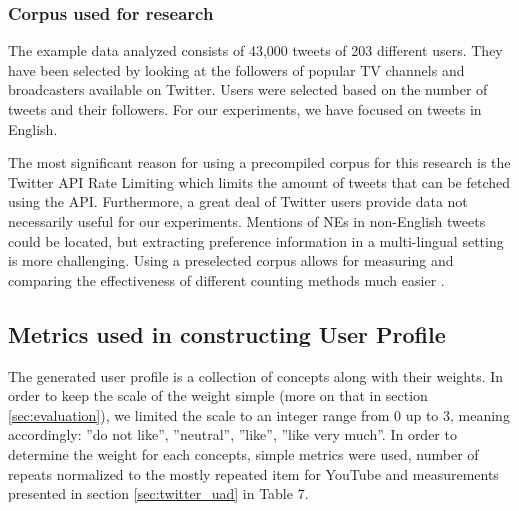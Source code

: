 \subsubsection{Corpus used for research}
\label{sec:twitter_corpus}

The example data analyzed consists of 43,000 tweets of 203 different users.
They have been selected by looking at the followers of popular TV channels and broadcasters
available on Twitter. Users were selected based on the number of tweets and their followers.
For our experiments, we have focused on tweets in English.

The most significant reason for using a precompiled corpus for this research is the Twitter API
Rate Limiting which limits the amount of tweets that can be fetched using the API.
Furthermore, a great deal of Twitter users provide data not necessarily
useful for our experiments. Mentions of NEs in non-English tweets could be located, but
extracting preference information in a multi-lingual setting is more challenging.
Using a preselected corpus allows for measuring and comparing the effectiveness of different
counting methods much easier \cite{short-tweet}.

\subsection{Metrics used in constructing User Profile}

The generated user profile is a collection of concepts along with their
weights. In order to keep the scale of the weight simple (more on that in section
\ref{sec:evaluation}), we limited the scale to an integer range from 0
up to 3, meaning accordingly: ''do not like'', ''neutral'', ''like'', ''like
very much''. In order to determine the weight for each concepts, simple metrics
were used, \ie number of repeats normalized to the mostly repeated item for
YouTube and measurements presented in section \ref{sec:twitter_uad} in Table 7.

